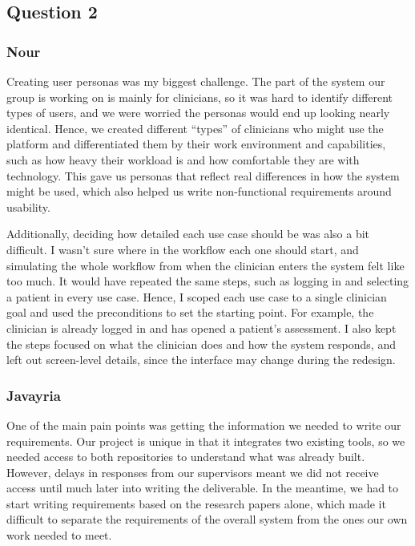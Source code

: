 \documentclass[12pt]{article}
\begin{document}
\subsection*{Question 2}
\subsubsection*{Nour}
Creating user personas was my biggest challenge. 
The part of the system our group is working on is mainly for clinicians, so it was hard to identify different types of users, and we were worried the personas would end up looking nearly identical. 
Hence, we created different “types” of clinicians who might use the platform and differentiated them by their work environment and capabilities, such as how heavy their workload is and how comfortable they are with technology. 
This gave us personas that reflect real differences in how the system might be used, which also helped us write non-functional requirements around usability.

Additionally, deciding how detailed each use case should be was also a bit difficult. 
I wasn’t sure where in the workflow each one should start, and simulating the whole workflow from when the clinician enters the system felt like too much. 
It would have repeated the same steps, such as logging in and selecting a patient in every use case. 
Hence, I scoped each use case to a single clinician goal and used the preconditions to set the starting point. 
For example, the clinician is already logged in and has opened a patient’s assessment. 
I also kept the steps focused on what the clinician does and how the system responds, and left out screen-level details, since the interface may change during the redesign.

\subsubsection*{Javayria}
One of the main pain points was getting the information we needed to write our requirements. Our project is unique in that it integrates two existing tools, so we needed access to both repositories to understand what was already built. However, delays in responses from our supervisors meant we did not receive access until much later into writing the deliverable. In the meantime, we had to start writing requirements based on the research papers alone, which made it difficult to separate the requirements of the overall system from the ones our own work needed to meet.
\end{document}
